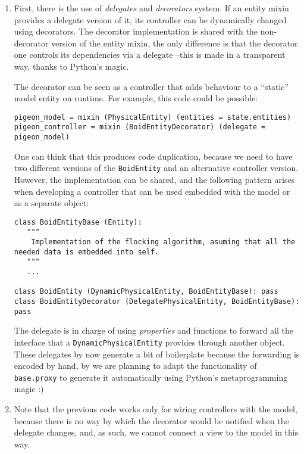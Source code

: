 \documentclass[a4paper,10pt]{article}
\begin{document}
\begin{enumerate}
\item First, there is the use of \emph{delegates} and \emph{decorators}
  system. If an entity mixin provides a delegate version of it, its
  controller can be dynamically changed using decorators. The
  decorator implementation is shared with the non-decorator version of
  the entity mixin, the only difference is that the decorator one
  controls its dependencies via a delegate --this is
  made in a transparent way, thanks to Python's magic. 

  The decorator can be seen as a controller that adds behaviour to a
  ``static'' model entity on runtime. For example, this code could be
  possible:

{\footnotesize
\begin{verbatim}
pigeon_model = mixin (PhysicalEntity) (entities = state.entities)
pigeon_controller = mixin (BoidEntityDecorator) (delegate = pigeon_model)
\end{verbatim}
}

One can think that this produces code duplication, because we need to
have two different versions of the \texttt{BoidEntity} and an
alternative controller version. However, the implementation can be
shared, and the following pattern arises when developing a controller
that can be used embedded with the model or as a separate object:

{\footnotesize
\begin{verbatim}
class BoidEntityBase (Entity):
   """
    Implementation of the flocking algorithm, asuming that all the
needed data is embedded into self.
   """
   ...

class BoidEntity (DynamicPhysicalEntity, BoidEntityBase): pass
class BoidEntityDecorator (DelegatePhysicalEntity, BoidEntityBase): pass
\end{verbatim}
}

The delegate is in charge of using \emph{properties} and functions to
forward all the interface that a \texttt{DynamicPhysicalEntity}
provides through another object. These delegates by now generate
a bit of boilerplate because the forwarding is encoded by hand, by we
are planning to adapt the functionality of \texttt{base.proxy} to
generate it automatically using Python's metaprogramming magic :)

\item Note that the previous code works only for wiring controllers
  with the model, because there is no way by which the decorator would
  be notified when the delegate changes, and, as such, we cannot
  connect a view to the model in this way.


\end{enumerate}
\end{document}
